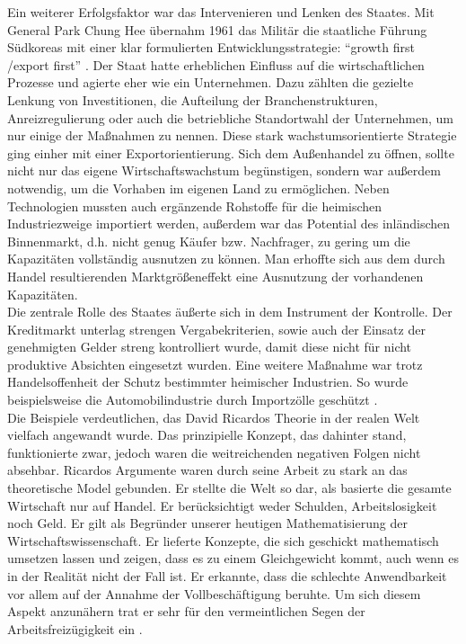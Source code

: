  Ein weiterer Erfolgsfaktor war das Intervenieren und Lenken des Staates.  Mit General Park Chung Hee übernahm 1961 das Militär die staatliche Führung Südkoreas mit einer klar formulierten Entwicklungsstrategie: "`growth first /export first"' \cite[S. 111]{Engelhard.2004}. Der Staat hatte erheblichen Einfluss auf die wirtschaftlichen Prozesse und agierte eher wie ein Unternehmen. Dazu zählten die gezielte Lenkung von Investitionen, die Aufteilung der Branchenstrukturen, Anreizregulierung oder auch die betriebliche Standortwahl der Unternehmen, um nur einige der Maßnahmen zu nennen. Diese stark wachstumsorientierte Strategie ging einher mit einer Exportorientierung. Sich dem Außenhandel zu öffnen, sollte nicht nur das eigene Wirtschaftswachstum begünstigen, sondern war außerdem notwendig, um die Vorhaben im eigenen Land zu ermöglichen. Neben Technologien mussten auch ergänzende Rohstoffe für die heimischen Industriezweige importiert werden, außerdem war das Potential des inländischen Binnenmarkt, d.h. nicht genug Käufer bzw. Nachfrager, zu gering um die Kapazitäten vollständig ausnutzen zu können. Man erhoffte sich aus dem durch Handel resultierenden Marktgrößeneffekt eine Ausnutzung der vorhandenen Kapazitäten. \\
%
 Die zentrale Rolle des Staates äußerte sich in dem Instrument der Kontrolle. Der Kreditmarkt unterlag strengen Vergabekriterien, sowie auch der Einsatz der genehmigten Gelder streng kontrolliert wurde, damit diese nicht für nicht produktive Absichten eingesetzt wurden. Eine weitere Maßnahme war trotz Handelsoffenheit der Schutz bestimmter heimischer Industrien. So wurde beispielsweise die  Automobilindustrie durch Importzölle geschützt \cite{Engelhard.2004}. \\
%
Die Beispiele verdeutlichen, das David Ricardos Theorie in der realen Welt vielfach angewandt wurde. Das prinzipielle Konzept, das dahinter stand, funktionierte zwar, jedoch waren die weitreichenden negativen Folgen nicht absehbar. Ricardos Argumente waren durch seine Arbeit zu stark an das theoretische Model gebunden. Er stellte die Welt so dar, als basierte die gesamte Wirtschaft nur auf Handel. Er berücksichtigt weder Schulden, Arbeitslosigkeit noch Geld. Er gilt als Begründer unserer heutigen Mathematisierung der Wirtschaftswissenschaft. Er lieferte Konzepte, die sich geschickt mathematisch umsetzen lassen und zeigen, dass es zu einem Gleichgewicht kommt, auch wenn es in der Realität nicht der Fall ist. Er erkannte, dass die schlechte Anwendbarkeit vor allem auf der Annahme der Vollbeschäftigung beruhte. Um sich diesem Aspekt anzunähern trat er sehr für den vermeintlichen Segen der Arbeitsfreizügigkeit ein \cite{Huther.2006}. \\
